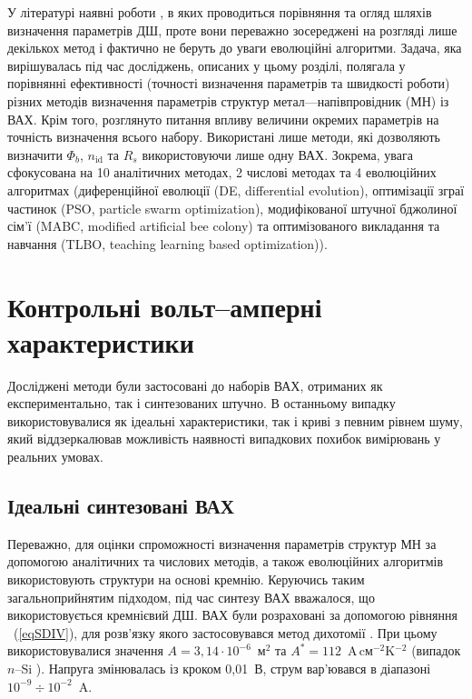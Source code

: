 У літературі наявні роботи \cite{Evangelou,Aubry,Kudryk}, в яких проводиться порівняння  та огляд шляхів визначення параметрів ДШ, проте вони переважно зосереджені на розгляді лише декількох метод і фактично не беруть до уваги еволюційні алгоритми.
Задача, яка вирішувалась під час досліджень, описаних у цьому розділі, полягала у порівнянні ефективності (точності визначення параметрів та швидкості роботи) різних методів визначення параметрів структур метал---напівпровідник (МН) із ВАХ.
Крім того, розглянуто питання впливу величини окремих параметрів на точність визначення всього набору.
Використані лише методи, які дозволяють визначити $\Phi_b$, $n_\mathrm{id}$ та $R_s$ використовуючи лише одну ВАХ.
Зокрема, увага сфокусована на 10 аналітичних методах, 2 числові методах та 4 еволюційних алгоритмах
(диференційної еволюції (DE, differential evolution),
оптимізації зграї частинок (PSO, particle swarm optimization),
модифікованої штучної бджолиної сім'ї (MABC, modified artificial bee colony) та
оптимізованого викладання та навчання (TLBO, teaching learning based optimization)).



\section{Контрольні вольт--амперні характеристики}
Досліджені методи були застосовані до наборів ВАХ, отриманих як експериментально, так і синтезованих штучно.
В останньому випадку використовувалися як ідеальні характеристики, так і криві з певним рівнем шуму, який віддзеркалював можливість наявності випадкових похибок вимірювань у реальних умовах.

\subsection{Ідеальні синтезовані ВАХ\label{SubData}}
Переважно, для оцінки спроможності визначення параметрів структур МН за допомогою аналітичних \cite{Norde,Lien,Werner,Gromov,Lee,Bohlin,Cibils,Mikhelashvili,Kaminski} та числових \cite{Evangelou,Donoval} методів, а також еволюційних алгоритмів \cite{PSO_Ye,P-DE_Ishaque,TLBO_Patel} використовують структури на основі кремнію.
Керуючись таким загальноприйнятим підходом, під час синтезу ВАХ вважалося, що використовується кремнієвий ДШ.
ВАХ були розраховані за допомогою рівняння ~(\ref{eqSDIV}), для розв'язку якого застосовувався метод дихотомії \cite[с.~158]{KalitkinBook}.
При цьому використовувалися значення $A=3,14\cdot10^{-6}$~м$^2$ та $A^*=112$~A$\,$cм$^{-2}$K$^{-2}$ (випадок $n$--Si \cite{Schroder2006}).
Напруга змінювалась із кроком 0,01~В, струм вар'ювався в діапазоні $10^{-9}\div10^{-2}$~A.

